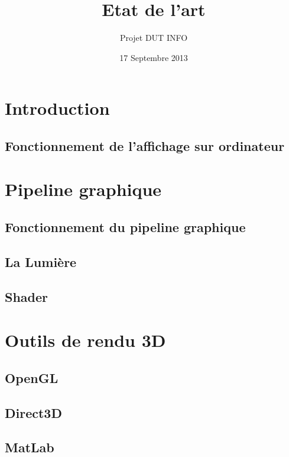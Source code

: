 \documentclass[12pt,a4paper,openany]{report}
\title{Etat de l'art}
\author{Projet DUT INFO}
\date{17 Septembre 2013}
\begin{document}
\maketitle

\hypertarget{tableofcontents}{} %
\tableofcontents

\part{Introduction}

\chapter{Fonctionnement de l'affichage sur ordinateur}


\part{Pipeline graphique}
\chapter{Fonctionnement du pipeline graphique}


\chapter{La Lumière}


\chapter{Shader}


\part{Outils de rendu 3D}

\chapter{OpenGL}

\chapter{Direct3D}


\chapter{MatLab}


\newpage

\end{document}
